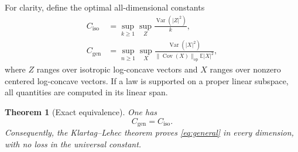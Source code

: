 \documentclass[11pt]{article}
\newtheorem{theorem}{Theorem}
\newcommand{\E}{\mathbb E}
\newcommand{\Var}{\operatorname{Var}}
\newcommand{\Cov}{\operatorname{Cov}}
\begin{document}
For clarity, define the optimal all-dimensional constants
\begin{align*}
C_{\mathrm{iso}}
 &=\sup_{k\geq1}\sup_Z \frac{\Var(|Z|^2)}{k},\\
C_{\mathrm{gen}}
 &=\sup_{n\geq1}\sup_X
 \frac{\Var(|X|^2)}{\|\Cov(X)\|_{\mathrm{op}}\E|X|^2},
\end{align*}
where $Z$ ranges over isotropic log-concave vectors and $X$ ranges over
nonzero centered log-concave vectors. If a law is supported on a proper
linear subspace, all quantities are computed in its linear span.

\begin{theorem}[Exact equivalence]\label{thm:exact}
One has
\[
  C_{\mathrm{gen}}=C_{\mathrm{iso}}.
\]
Consequently, the Klartag--Lehec theorem proves \eqref{eq:general} in every
dimension, with no loss in the universal constant.
\end{theorem}
\end{document}
